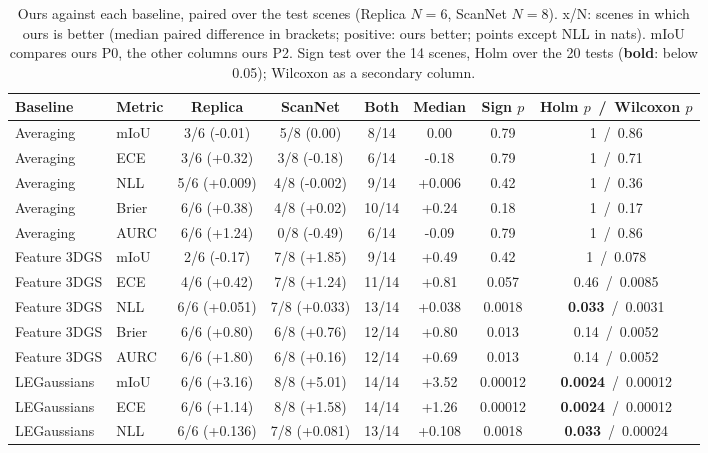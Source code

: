 \documentclass[journal]{IEEEtran}
\begin{document}
\begin{table}[t]
\centering
\caption{Ours against each baseline, paired over the test scenes (Replica $N=6$, ScanNet $N=8$). x/N: scenes in which ours is better (median paired difference in brackets; positive: ours better; points except NLL in nats). mIoU compares ours P0, the other columns ours P2. Sign test over the 14 scenes, Holm over the 20 tests (\textbf{bold}: below 0.05); Wilcoxon as a secondary column.}
\label{tab:paired}
\footnotesize
\setlength{\tabcolsep}{4pt}
\begin{tabular}{@{}llcccccc@{}}
\toprule
Baseline & Metric & Replica & ScanNet & Both & Median & Sign $p$ & Holm $p$ \,/\, Wilcoxon $p$\\
\midrule
Averaging & mIoU & 3/6 (-0.01) & 5/8 (0.00) & 8/14 & 0.00 & 0.79 & 1 \,/\, 0.86\\
Averaging & ECE & 3/6 (+0.32) & 3/8 (-0.18) & 6/14 & -0.18 & 0.79 & 1 \,/\, 0.71\\
Averaging & NLL & 5/6 (+0.009) & 4/8 (-0.002) & 9/14 & +0.006 & 0.42 & 1 \,/\, 0.36\\
Averaging & Brier & 6/6 (+0.38) & 4/8 (+0.02) & 10/14 & +0.24 & 0.18 & 1 \,/\, 0.17\\
Averaging & AURC & 6/6 (+1.24) & 0/8 (-0.49) & 6/14 & -0.09 & 0.79 & 1 \,/\, 0.86\\
\midrule
Feature 3DGS & mIoU & 2/6 (-0.17) & 7/8 (+1.85) & 9/14 & +0.49 & 0.42 & 1 \,/\, 0.078\\
Feature 3DGS & ECE & 4/6 (+0.42) & 7/8 (+1.24) & 11/14 & +0.81 & 0.057 & 0.46 \,/\, 0.0085\\
Feature 3DGS & NLL & 6/6 (+0.051) & 7/8 (+0.033) & 13/14 & +0.038 & 0.0018 & \textbf{0.033} \,/\, 0.0031\\
Feature 3DGS & Brier & 6/6 (+0.80) & 6/8 (+0.76) & 12/14 & +0.80 & 0.013 & 0.14 \,/\, 0.0052\\
Feature 3DGS & AURC & 6/6 (+1.80) & 6/8 (+0.16) & 12/14 & +0.69 & 0.013 & 0.14 \,/\, 0.0052\\
\midrule
LEGaussians & mIoU & 6/6 (+3.16) & 8/8 (+5.01) & 14/14 & +3.52 & 0.00012 & \textbf{0.0024} \,/\, 0.00012\\
LEGaussians & ECE & 6/6 (+1.14) & 8/8 (+1.58) & 14/14 & +1.26 & 0.00012 & \textbf{0.0024} \,/\, 0.00012\\
LEGaussians & NLL & 6/6 (+0.136) & 7/8 (+0.081) & 13/14 & +0.108 & 0.0018 & \textbf{0.033} \,/\, 0.00024\\

\end{tabular}
\end{table}
\end{document}
